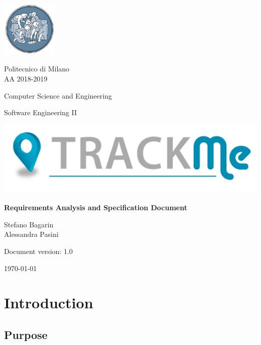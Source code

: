 \documentclass[a4paper,12pt]{report}
\begin{document}
	\begin{titlepage}
		\centering
		\includegraphics[width=0.20\textwidth]{./pictures/logo_polimi.png}\par

		{Politecnico di Milano \\ AA 2018-2019} \par
		\vspace{1.5cm}

		{Computer Science and Engineering}\par
		\Large{Software Engineering II}\par
		\vspace{1.0cm}

		\includegraphics[width=1.00\textwidth]{./pictures/logo_trackme.png}\par
		{\LARGE \textbf{Requirements Analysis and Specification Document} \par}
		\vspace{1.0cm}
		{\Large Stefano Bagarin\\ Alessandra Pasini\par}
		\vspace{2cm}
		\vfill

		{\large Document version: 1.0\par}
		{\large \today \par}
	\end{titlepage}

	\tableofcontents

	\chapter{Introduction}
	\label{ch:Introduction}

	\section{Purpose}
	
\end{document}
